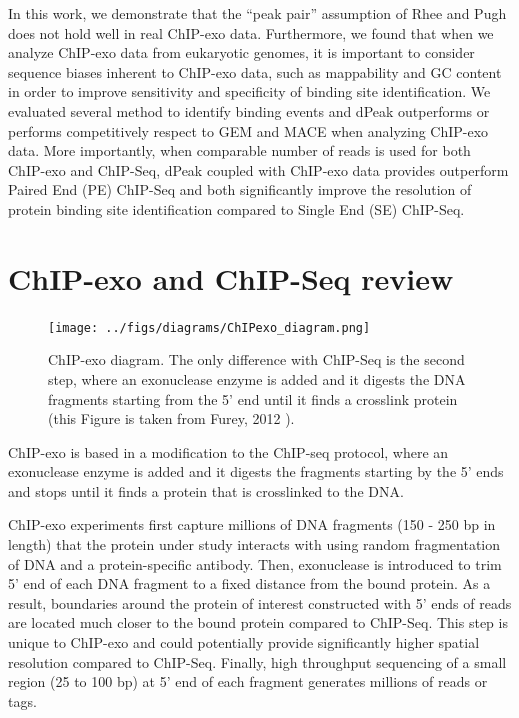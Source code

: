 \documentclass[11pt]{article}\usepackage[]{graphicx}\usepackage[]{color}
\begin{document}
In this work, we demonstrate that the ``peak pair'' assumption of Rhee
and Pugh \cite{exo1} does not hold well in real ChIP-exo
data. Furthermore, we found that when we analyze ChIP-exo data from
eukaryotic genomes, it is important to consider sequence biases
inherent to ChIP-exo data, such as mappability and GC content in order
to improve sensitivity and specificity of binding site
identification. We evaluated several method to identify binding events
and dPeak outperforms or performs competitively respect to GEM and
MACE when analyzing ChIP-exo data. More importantly, when comparable
number of reads is used for both ChIP-exo and ChIP-Seq, dPeak coupled
with ChIP-exo data provides outperform Paired End (PE) ChIP-Seq and
both significantly improve the resolution of protein binding site
identification compared to Single End (SE) ChIP-Seq.

\section{ChIP-exo and ChIP-Seq review}
\label{sec:exo}

\begin{figure}
\centering
\texttt{[image: ../figs/diagrams/ChIPexo\_diagram.png]}
\caption{ChIP-exo diagram. The only difference with ChIP-Seq is the
  second step, where an exonuclease enzyme is added and it digests the
  DNA fragments starting from the 5' end until it finds a crosslink
  protein (this Figure is taken from Furey, 2012 \cite{chipbeyond}).}
\label{fig:exo}
\end{figure}

ChIP-exo is based in a modification to the ChIP-seq protocol, where an
exonuclease enzyme is added and it digests the fragments starting by
the 5' ends and stops until it finds a protein that is crosslinked to
the DNA.

ChIP-exo experiments first capture millions of DNA fragments (150 -
250 bp in length) that the protein under study interacts with using
random fragmentation of DNA and a protein-specific antibody. Then,
exonuclease is introduced to trim 5' end of each DNA fragment to a
fixed distance from the bound protein. As a result, boundaries around
the protein of interest constructed with 5' ends of reads are located
much closer to the bound protein compared to ChIP-Seq. This step is
unique to ChIP-exo and could potentially provide significantly higher
spatial resolution compared to ChIP-Seq. Finally, high throughput
sequencing of a small region (25 to 100 bp) at 5' end of each fragment
generates millions of reads or tags.
\end{document}
